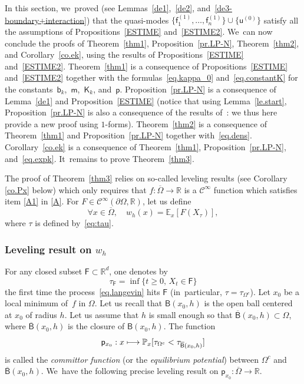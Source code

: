 \documentclass[10pt]{amsart}
\newcommand\mto{\mathchoice{\longmapsto}{\mapsto}{\mapsto}{\mapsto}}
\theoremstyle{plain}
\theoremstyle{definition}
\begin{document}
In this section, we~proved (see Lemmas~\ref{de1},~\ref{de2}, and~\ref{de3-boundary+interaction}) that the quasi-modes $\{\mathsf f_1^{(1)}, \ldots, \mathsf f_n^{(1)}\} \cup \{ \mathsf u^{(0)} \}$ satisfy all the assumptions of
Propositions~\ref{ESTIME} and~\ref{ESTIME2}. We~can now conclude the proofs of Theorem~\ref{thm1}, Proposition~\ref{pr.LP-N}, Theorem~\ref{thm2}, and Corollary~\ref{co.ek}, using the results of Propositions~\ref{ESTIME} and~\ref{ESTIME2}.
Theorem~\ref{thm1} is a consequence of Propositions~\ref{ESTIME}
and~\ref{ESTIME2} together with the formulas~\eqref{eq.kappa_0}
and~\eqref{eq.constantK} for the constants~$\mathsf b_k$,~$\mathsf
m$,~$\mathsf K_k$, and~$\mathsf p$. Proposition~\ref{pr.LP-N} is a
consequence of Lemma~\ref{de1} and
Proposition~\ref{ESTIME} (notice
that using Lemma~\ref{le.start}, Proposition~\ref{pr.LP-N} is also a
consequence of the results of~\cite{DoNe2}: we thus here provide a new
proof using $1$-forms). Theorem~\ref{thm2} is a consequence of
Theorem~\ref{thm1} and Proposition~\ref{pr.LP-N} together
with~\eqref{eq.dens}. Corollary~\ref{co.ek} is a consequence of
Theorem~\ref{thm1}, Proposition~\ref{pr.LP-N},
and~\eqref{eq.expk}. It~remains to prove Theorem~\ref{thm3}.

\label{sec.proof}

The proof of Theorem~\ref{thm3} relies on so-called leveling results (see Corollary \ref{co.Px} below) which only requires that $f:\overline \Omega\to \mathbb R$ is a $\mathcal C^\infty$ function which satisfies item \eqref{A1} in \ref{A}. For $F\in\mathcal C^{\infty}(\partial \Omega,\mathbb R)$, let us define\vspace*{-3pt}
\begin{equation}\label{eq.wh}
\forall x\in \overline
\Omega, \quad
w_h(x)=\mathbb
E_{x} [ F (X_{\tau})],
\end{equation}
where $\tau$ is defined by~\eqref{eq:tau}.

\subsubsection{{Leveling result} on $w_h$}
For any {closed} subset $\mathsf F \subset \mathbb R^d$, one denotes by
\[
\tau_{\mathsf F}=\inf \{ t\geq 0,\, X_t \in \mathsf F
\}
\]
the first time the process~\eqref{eq.langevin} hits $\mathsf F$
(in~particular, $\tau=\tau_{\Omega^c}$).
Let $x_0$ be a local minimum of~$f$ in $\Omega$. Let us recall that ${\mathsf B(x_0,h)}$ is the open ball centered at $x_0$ of radius $h$.
Let us assume that $h$ is small enough so that $ \overline{\mathsf B}(x_0,h)\subset \Omega$, where $ \overline{\mathsf B}(x_0,h)$ is the closure of ${\mathsf B}(x_0,h)$.
The function
\[
\mathsf p_{x_0}: x\mto \mathbb P_{x}[ \tau_{\Omega^c}<\tau_{ \overline{\mathsf B}(x_0,h)}]
\]
is called the \textit{committor function} (or the \textit{equilibrium potential}) between $\Omega^c$ and $ \overline{\mathsf B}(x_0,h)$. We~have the following precise leveling result on $\mathsf p_{x_0}:\overline \Omega\to \mathbb R$.
\end{document}
